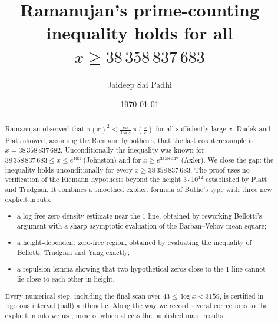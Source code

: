 \documentclass[11pt]{amsart}
\title[Ramanujan's prime-counting inequality]{Ramanujan's prime-counting inequality holds for all $x \geq 38\,358\,837\,683$}
\author{Jaideep Sai Padhi}
\date{\today}
\numberwithin{equation}{section}
\theoremstyle{definition}
\theoremstyle{remark}
\begin{document}
\sloppy
\begin{abstract}
Ramanujan observed that $\pi(x)^2 < \frac{e x}{\log x}\,\pi\!\left(\frac{x}{e}\right)$ for all sufficiently large $x$.
Dudek and Platt showed, assuming the Riemann hypothesis, that the last counterexample is $x = 38\,358\,837\,682$.
Unconditionally the inequality was known for $38\,358\,837\,683 \le x \le e^{103}$ (Johnston) and for $x \ge e^{3158.442}$ (Axler).
We close the gap: the inequality holds unconditionally for every $x \ge 38\,358\,837\,683$.
The proof uses no verification of the Riemann hypothesis beyond the height $3\cdot 10^{12}$ established by Platt and Trudgian.
It combines a smoothed explicit formula of B\"uthe's type with three new explicit inputs:
\begin{itemize}
\item a log-free zero-density estimate near the $1$-line, obtained by reworking Bellotti's argument with a sharp asymptotic evaluation of the Barban--Vehov mean square;
\item a height-dependent zero-free region, obtained by evaluating the inequality of Bellotti, Trudgian and Yang exactly;
\item a repulsion lemma showing that two hypothetical zeros close to the $1$-line cannot lie close to each other in height.
\end{itemize}
Every numerical step, including the final scan over $43\le\log x<3159$, is certified in rigorous interval (ball) arithmetic.
Along the way we record several corrections to the explicit inputs we use, none of which affects the published main results.
\end{abstract}
\maketitle
\tableofcontents
\end{document}
